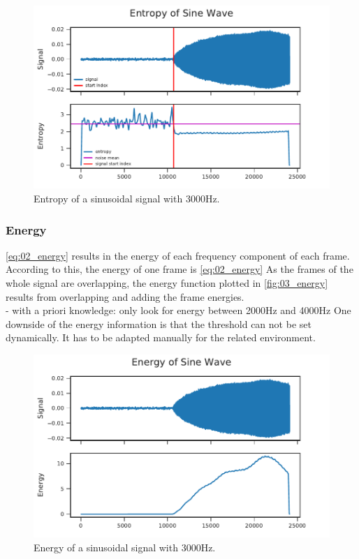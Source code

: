 \begin{figure}[ht]
	\centering
		\includegraphics[]{figures/sine_entropy}
	\caption{Entropy of a sinusoidal signal with 3000Hz.}
\end{figure}
\label{fig:03_entropy}

\subsubsection*{Energy}

\ref{eq:02_energy} results in the energy of each frequency component of each frame.
According to this, the energy of one frame is \ref{eq:02_energy}
As the frames of the whole signal are overlapping, the energy function plotted in
\ref{fig:03_energy} results from overlapping and adding the frame energies.\\
- with a priori knowledge: only look for energy between 2000Hz and 4000Hz
One downside of the energy information is that the threshold can not be
set dynamically. It has to be adapted manually for the related environment.

\begin{figure}[ht]
	\centering
		\includegraphics[]{figures/sine_energy}
	\caption{Energy of a sinusoidal signal with 3000Hz.}
\end{figure}
\label{fig:03_energy}


